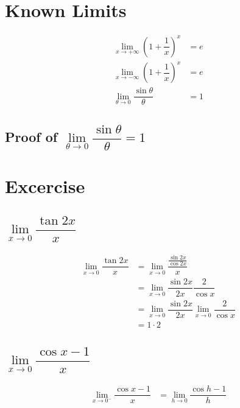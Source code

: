 \documentclass[fleqn]{article}
\begin{document}
\section{Known Limits}

\begin{align*}
	\lim\limits_{x \rightarrow +\infty} \left(1 + \dfrac{1}{x}\right) ^x &= e\\
	\lim\limits_{x \rightarrow -\infty} \left(1 + \dfrac{1}{x}\right) ^x &= e\\
	\lim\limits_{\theta \rightarrow 0} \dfrac{\sin \theta}{\theta} &= 1
\end{align*}

\subsection{Proof of $\lim\limits_{\theta \rightarrow 0} \dfrac{\sin \theta}{\theta} = 1$}

\section{Excercise}

\subsection{$\lim\limits_{x \rightarrow 0} \dfrac{\tan 2x}{x}$}

\begin{align*}
	\lim\limits_{x \rightarrow 0} \dfrac{\tan 2x}{x} &= \lim\limits_{x \rightarrow 0} \dfrac{\frac{\sin 2x}{\cos 2x}}{x}\\
	&= \lim\limits_{x \rightarrow 0} \dfrac{\sin 2x}{2x} \dfrac{2}{\cos x}\\
	&=\lim\limits_{x \rightarrow 0}  \dfrac{\sin 2x}{2x} \lim\limits_{x \rightarrow 0} \dfrac{2}{\cos x}\\
	&= 1 \cdot 2
\end{align*}

\subsection{$\lim\limits_{x \rightarrow 0} \dfrac{\cos x - 1}{x}$}

\begin{align*}
	\lim\limits_{x \rightarrow 0^-} \dfrac{\cos x - 1}{x} &= \lim\limits_{h \rightarrow 0} \dfrac{\cos h - 1}{h}
\end{align*}
\end{document}
